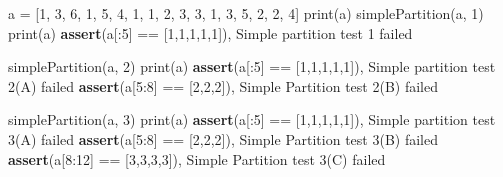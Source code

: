 \documentclass[
]{article}
\newenvironment{Shaded}{}{}
\newcommand{\BuiltInTok}[1]{\textcolor[rgb]{0.00,0.50,0.00}{#1}}
\newcommand{\ControlFlowTok}[1]{\textcolor[rgb]{0.00,0.44,0.13}{\textbf{#1}}}
\newcommand{\DecValTok}[1]{\textcolor[rgb]{0.25,0.63,0.44}{#1}}
\newcommand{\NormalTok}[1]{#1}
\newcommand{\OperatorTok}[1]{\textcolor[rgb]{0.40,0.40,0.40}{#1}}
\newcommand{\StringTok}[1]{\textcolor[rgb]{0.25,0.44,0.63}{#1}}
\begin{document}
\begin{Shaded}
\begin{Highlighting}[]
\NormalTok{a }\OperatorTok{=}\NormalTok{ [}\DecValTok{1}\NormalTok{, }\DecValTok{3}\NormalTok{, }\DecValTok{6}\NormalTok{, }\DecValTok{1}\NormalTok{, }\DecValTok{5}\NormalTok{, }\DecValTok{4}\NormalTok{, }\DecValTok{1}\NormalTok{, }\DecValTok{1}\NormalTok{, }\DecValTok{2}\NormalTok{, }\DecValTok{3}\NormalTok{, }\DecValTok{3}\NormalTok{, }\DecValTok{1}\NormalTok{, }\DecValTok{3}\NormalTok{, }\DecValTok{5}\NormalTok{, }\DecValTok{2}\NormalTok{, }\DecValTok{2}\NormalTok{, }\DecValTok{4}\NormalTok{]}
\BuiltInTok{print}\NormalTok{(a)}
\NormalTok{simplePartition(a, }\DecValTok{1}\NormalTok{)}
\BuiltInTok{print}\NormalTok{(a)}
\ControlFlowTok{assert}\NormalTok{(a[:}\DecValTok{5}\NormalTok{] }\OperatorTok{==}\NormalTok{ [}\DecValTok{1}\NormalTok{,}\DecValTok{1}\NormalTok{,}\DecValTok{1}\NormalTok{,}\DecValTok{1}\NormalTok{,}\DecValTok{1}\NormalTok{]), }\StringTok{\textquotesingle{}Simple partition test 1 failed\textquotesingle{}}

\NormalTok{simplePartition(a, }\DecValTok{2}\NormalTok{)}
\BuiltInTok{print}\NormalTok{(a)}
\ControlFlowTok{assert}\NormalTok{(a[:}\DecValTok{5}\NormalTok{] }\OperatorTok{==}\NormalTok{ [}\DecValTok{1}\NormalTok{,}\DecValTok{1}\NormalTok{,}\DecValTok{1}\NormalTok{,}\DecValTok{1}\NormalTok{,}\DecValTok{1}\NormalTok{]), }\StringTok{\textquotesingle{}Simple partition test 2(A) failed\textquotesingle{}}
\ControlFlowTok{assert}\NormalTok{(a[}\DecValTok{5}\NormalTok{:}\DecValTok{8}\NormalTok{] }\OperatorTok{==}\NormalTok{ [}\DecValTok{2}\NormalTok{,}\DecValTok{2}\NormalTok{,}\DecValTok{2}\NormalTok{]), }\StringTok{\textquotesingle{}Simple Partition test 2(B) failed\textquotesingle{}}


\NormalTok{simplePartition(a, }\DecValTok{3}\NormalTok{)}
\BuiltInTok{print}\NormalTok{(a)}
\ControlFlowTok{assert}\NormalTok{(a[:}\DecValTok{5}\NormalTok{] }\OperatorTok{==}\NormalTok{ [}\DecValTok{1}\NormalTok{,}\DecValTok{1}\NormalTok{,}\DecValTok{1}\NormalTok{,}\DecValTok{1}\NormalTok{,}\DecValTok{1}\NormalTok{]), }\StringTok{\textquotesingle{}Simple partition test 3(A) failed\textquotesingle{}}
\ControlFlowTok{assert}\NormalTok{(a[}\DecValTok{5}\NormalTok{:}\DecValTok{8}\NormalTok{] }\OperatorTok{==}\NormalTok{ [}\DecValTok{2}\NormalTok{,}\DecValTok{2}\NormalTok{,}\DecValTok{2}\NormalTok{]), }\StringTok{\textquotesingle{}Simple Partition test 3(B) failed\textquotesingle{}}
\ControlFlowTok{assert}\NormalTok{(a[}\DecValTok{8}\NormalTok{:}\DecValTok{12}\NormalTok{] }\OperatorTok{==}\NormalTok{ [}\DecValTok{3}\NormalTok{,}\DecValTok{3}\NormalTok{,}\DecValTok{3}\NormalTok{,}\DecValTok{3}\NormalTok{]), }\StringTok{\textquotesingle{}Simple Partition test 3(C) failed\textquotesingle{}}


\end{Highlighting}
\end{Shaded}
\end{document}
